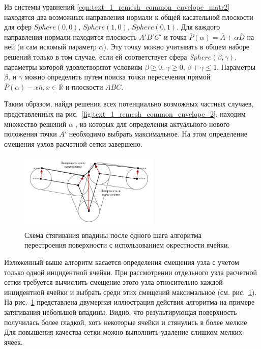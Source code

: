 Из системы уравнений \eqref{eqn:text_1_remesh_common_envelope_matr2} находятся два возможных направления нормали к общей касательной плоскости для сфер $Sphere(0,0)$, $Sphere(1,0)$, $Sphere(0,1)$.
Для каждого направления нормали находится плоскость $A'B'C'$ и точка $\overline{P}(\alpha) = \overline{A} + \alpha \overline{D}$ на ней (и сам искомый параметр $\alpha$).
Эту точку можно учитывать в общем наборе решений только в том случае, если ей соответствует сфера $Sphere(\beta, \gamma)$, параметры которой удовлетворяют условиям $\beta \ge 0$, $\gamma \ge 0$, $\beta + \gamma \le 1$.
Параметры $\beta$, и $\gamma$ можно определить путем поиска точки пересечения прямой $\overline{P}(\alpha) - x \overline{n}, x \in \mathbb{R}$ и плоскости $ABC$.

Таким образом, найдя решения всех потенциально возможных частных случаев, представленных на рис.~\ref{fig:text_1_remesh_common_envelope_2}, находим множество решений $\alpha$ , из которых для определения актуального нового положения точки $A'$ необходимо выбрать максимальное.
На этом определение смещения узлов расчетной сетки завершено.

\begin{figure}[ht]
\centering
\includegraphics[width=0.6\textwidth]{./pics/text_1_remesh_common_envelope/out_from_cave.pdf}
\singlespacing
{}\caption{Схема стягивания впадины после одного шага алгоритма перестроения поверхности с использованием окрестности ячейки.}
\label{fig:text_1_remesh_common_envelope_4}
\end{figure}

Изложенный выше алгоритм касается определения смещения узла с учетом только одной инцидентной ячейки.
При рассмотрении отдельного узла расчетной сетки требуется вычислить смещение этого узла относительно каждой инцидентной ячейки и выбрать среди этих смещений максимальное (см. рис.~\ref{fig:text_1_remesh_common_envelope_4}).
На рис.~\ref{fig:text_1_remesh_common_envelope_4} представлена двумерная иллюстрация действия алгоритма на примере затягивания небольшой впадины.
Видно, что результирующая поверхность получилась более гладкой, хоть некоторые ячейки и стянулись в более мелкие.
Для повышения качества сетки можно выполнить удаление слишком мелких ячеек.

